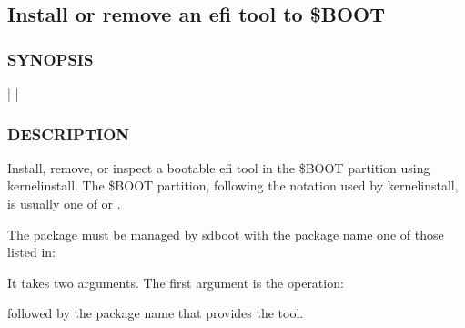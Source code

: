 \documentclass[letterpaper,11pt,english]{sphinxmanual}
\begin{document}
\subsection{Install or remove an efi tool to \$BOOT}
\label{\detokenize{_build/man-ready/sd-boot-efi-tool-update.8:install-or-remove-an-efi-tool-to-boot}}

\subsubsection{SYNOPSIS}
\label{\detokenize{_build/man-ready/sd-boot-efi-tool-update.8:synopsis}}
\sphinxAtStartPar
{}  |  |  


\subsubsection{DESCRIPTION}
\label{\detokenize{_build/man-ready/sd-boot-efi-tool-update.8:description}}
\sphinxAtStartPar
Install, remove, or inspect a bootable efi tool in the \$BOOT partition using kernel\sphinxhyphen{}install.
The \$BOOT partition, following the notation used by kernel\sphinxhyphen{}install, is usually one of  or .

\sphinxAtStartPar
The package must be managed by sd\sphinxhyphen{}boot with the package name one of those listed in:

\begin{sphinxVerbatim}[commandchars=\\\{\}]
\end{sphinxVerbatim}

\sphinxAtStartPar
It takes two arguments. The first argument is the operation:

\begin{sphinxVerbatim}[commandchars=\\\{\}]
    
\end{sphinxVerbatim}

\sphinxAtStartPar
followed by the package name that provides the tool.
\end{document}
